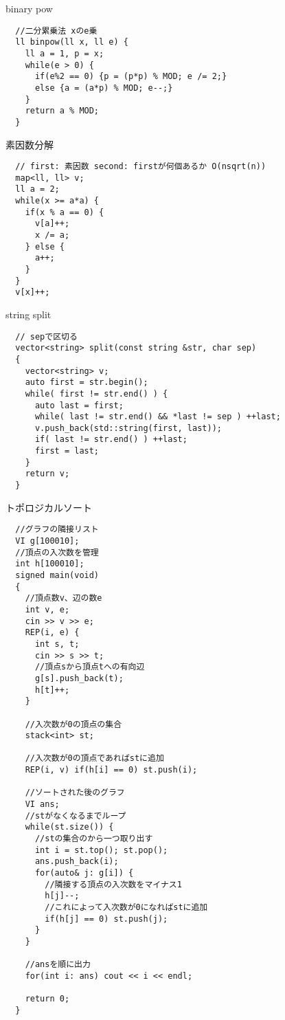 \documentclass[11pt,a4paper]{jsarticle}
\begin{document}
binary pow
\begin{lstlisting}
  //二分累乗法 xのe乗
  ll binpow(ll x, ll e) {
    ll a = 1, p = x;
    while(e > 0) {
      if(e%2 == 0) {p = (p*p) % MOD; e /= 2;}
      else {a = (a*p) % MOD; e--;}
    }
    return a % MOD;
  }
\end{lstlisting}

素因数分解
\begin{lstlisting}
  // first: 素因数 second: firstが何個あるか O(nsqrt(n))
  map<ll, ll> v;
  ll a = 2;
  while(x >= a*a) {
    if(x % a == 0) {
      v[a]++;
      x /= a;
    } else {
      a++;
    }
  }
  v[x]++;
\end{lstlisting}

string split
\begin{lstlisting}
  // sepで区切る
  vector<string> split(const string &str, char sep)
  {
    vector<string> v;
    auto first = str.begin();
    while( first != str.end() ) {
      auto last = first;
      while( last != str.end() && *last != sep ) ++last;
      v.push_back(std::string(first, last));
      if( last != str.end() ) ++last;
      first = last;
    }
    return v;
  }
\end{lstlisting}

トポロジカルソート
\begin{lstlisting}
  //グラフの隣接リスト
  VI g[100010];
  //頂点の入次数を管理
  int h[100010];
  signed main(void)
  {
    //頂点数v、辺の数e
    int v, e;
    cin >> v >> e;
    REP(i, e) {
      int s, t;
      cin >> s >> t;
      //頂点sから頂点tへの有向辺
      g[s].push_back(t);
      h[t]++;
    }

    //入次数が0の頂点の集合
    stack<int> st;

    //入次数が0の頂点であればstに追加
    REP(i, v) if(h[i] == 0) st.push(i);

    //ソートされた後のグラフ
    VI ans;
    //stがなくなるまでループ
    while(st.size()) {
      //stの集合のから一つ取り出す
      int i = st.top(); st.pop();
      ans.push_back(i);
      for(auto& j: g[i]) {
        //隣接する頂点の入次数をマイナス1
        h[j]--;
        //これによって入次数が0になればstに追加
        if(h[j] == 0) st.push(j);
      }
    }

    //ansを順に出力
    for(int i: ans) cout << i << endl;

    return 0;
  }
\end{lstlisting}
\end{document}
